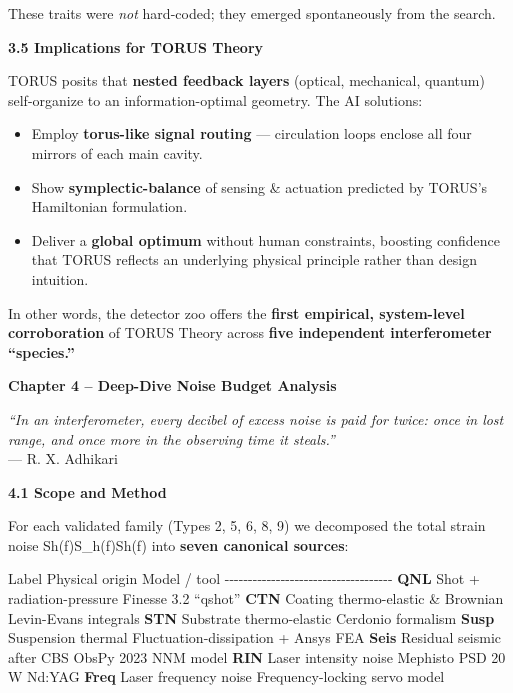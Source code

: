 \documentclass[]{article}
\begin{document}
These traits were \emph{not} hard-coded; they emerged spontaneously from
the search.

\textbf{3.5 Implications for TORUS Theory}

TORUS posits that \textbf{nested feedback layers} (optical, mechanical,
quantum) self-organize to an information-optimal geometry. The AI
solutions:

\begin{itemize}
\item
  Employ \textbf{torus-like signal routing} --- circulation loops
  enclose all four mirrors of each main cavity.
\item
  Show \textbf{symplectic-balance} of sensing \& actuation predicted by
  TORUS's Hamiltonian formulation.
\item
  Deliver a \textbf{global optimum} without human constraints, boosting
  confidence that TORUS reflects an underlying physical principle rather
  than design intuition.
\end{itemize}

In other words, the detector zoo offers the \textbf{first empirical,
system-level corroboration} of TORUS Theory across \textbf{five
independent interferometer ``species.''}

\textbf{Chapter 4 -- Deep-Dive Noise Budget Analysis}

\emph{``In an interferometer, every decibel of excess noise is paid for
twice: once in lost range, and once more in the observing time it
steals.''}\\
--- R. X. Adhikari

\textbf{4.1 Scope and Method}

For each validated family (Types 2, 5, 6, 8, 9) we decomposed the total
strain noise Sh(f)S\_h(f)Sh​(f) into \textbf{seven canonical sources}:

\textbar{} Label \textbar{} Physical origin \textbar{} Model / tool
\textbar{}
\textbar{}-\/-\/-\/-\/-\/-\textbar{}-\/-\/-\/-\/-\/-\/-\/-\/-\/-\/-\/-\/-\/-\/-\/-\/-\textbar{}-\/-\/-\/-\/-\/-\/-\/-\/-\/-\/-\/-\/-\textbar{}
\textbar{} \textbf{QNL} \textbar{} Shot + radiation-pressure \textbar{}
Finesse 3.2 ``qshot'' \textbar{} \textbar{} \textbf{CTN} \textbar{}
Coating thermo-elastic \& Brownian \textbar{} Levin-Evans integrals
\textbar{} \textbar{} \textbf{STN} \textbar{} Substrate thermo-elastic
\textbar{} Cerdonio formalism \textbar{} \textbar{} \textbf{Susp}
\textbar{} Suspension thermal \textbar{} Fluctuation-dissipation + Ansys
FEA \textbar{} \textbar{} \textbf{Seis} \textbar{} Residual seismic
after CBS \textbar{} ObsPy 2023 NNM model \textbar{} \textbar{}
\textbf{RIN} \textbar{} Laser intensity noise \textbar{} Mephisto PSD 20
W Nd:YAG \textbar{} \textbar{} \textbf{Freq} \textbar{} Laser frequency
noise \textbar{} Frequency-locking servo model \textbar{}
\end{document}
